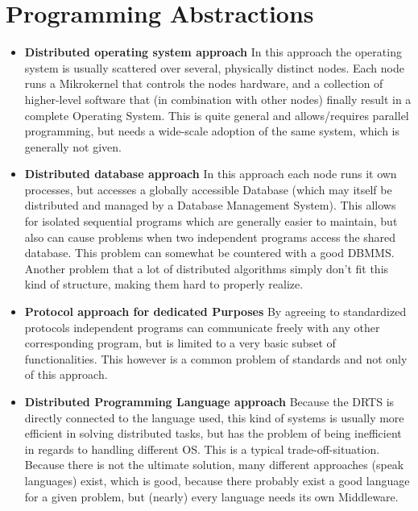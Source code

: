 \documentclass{tudexercise}
\begin{document}
	\section{Programming Abstractions}
		\begin{itemize}
			\item \textbf{Distributed operating system approach} In this approach the operating system is usually scattered over several, physically distinct nodes. Each node runs a Mikrokernel that controls the nodes hardware, and a collection of higher-level software that (in combination with other nodes) finally result in a complete Operating System. This is quite general and allows/requires parallel programming, but needs a wide-scale adoption of the same system, which is generally not given.
			\item \textbf{Distributed database approach} In this approach each node runs it own processes, but accesses a globally accessible Database (which may itself be distributed and managed by a Database Management System). This allows for isolated sequential programs which are generally easier to maintain, but also can cause problems when two independent programs access the shared database. This problem can somewhat be countered with a good DBMMS. Another problem that a lot of distributed algorithms simply don't fit this kind of structure, making them hard to properly realize.
			\item \textbf{Protocol approach for dedicated Purposes} By agreeing to standardized protocols independent programs can communicate freely with any other corresponding program, but is limited to a very basic subset of functionalities. This however is a common problem of standards and not only of this approach.
			\item \textbf{Distributed Programming Language approach} Because the DRTS is directly connected to the language used, this kind of systems is usually more efficient in solving distributed tasks, but has the problem of being inefficient in regards to handling different OS. This is a typical trade-off-situation. Because there is not the ultimate solution, many different approaches (speak languages) exist, which is good, because there probably exist a good language for a given problem, but (nearly) every language needs its own Middleware. 
		\end{itemize}
		
\end{document}
